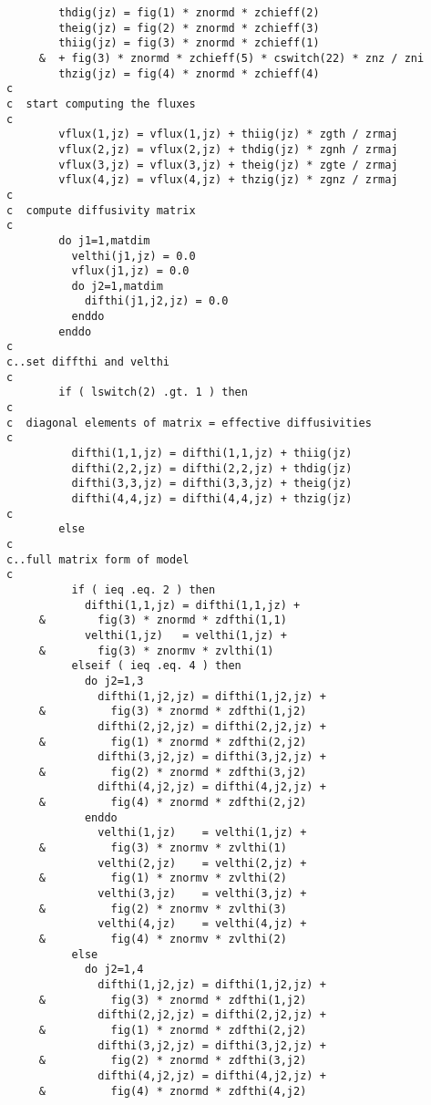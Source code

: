 \begin{verbatim}
        thdig(jz) = fig(1) * znormd * zchieff(2)
        theig(jz) = fig(2) * znormd * zchieff(3)
        thiig(jz) = fig(3) * znormd * zchieff(1)
     &  + fig(3) * znormd * zchieff(5) * cswitch(22) * znz / zni
        thzig(jz) = fig(4) * znormd * zchieff(4)
c
c  start computing the fluxes
c
        vflux(1,jz) = vflux(1,jz) + thiig(jz) * zgth / zrmaj
        vflux(2,jz) = vflux(2,jz) + thdig(jz) * zgnh / zrmaj
        vflux(3,jz) = vflux(3,jz) + theig(jz) * zgte / zrmaj
        vflux(4,jz) = vflux(4,jz) + thzig(jz) * zgnz / zrmaj
c
c  compute diffusivity matrix
c
        do j1=1,matdim
          velthi(j1,jz) = 0.0
          vflux(j1,jz) = 0.0
          do j2=1,matdim
            difthi(j1,j2,jz) = 0.0
          enddo
        enddo
c
c..set diffthi and velthi
c
        if ( lswitch(2) .gt. 1 ) then
c
c  diagonal elements of matrix = effective diffusivities
c
          difthi(1,1,jz) = difthi(1,1,jz) + thiig(jz)
          difthi(2,2,jz) = difthi(2,2,jz) + thdig(jz)
          difthi(3,3,jz) = difthi(3,3,jz) + theig(jz)
          difthi(4,4,jz) = difthi(4,4,jz) + thzig(jz)
c
        else
c
c..full matrix form of model
c
          if ( ieq .eq. 2 ) then
            difthi(1,1,jz) = difthi(1,1,jz) +
     &        fig(3) * znormd * zdfthi(1,1)
            velthi(1,jz)   = velthi(1,jz) +
     &        fig(3) * znormv * zvlthi(1)
          elseif ( ieq .eq. 4 ) then
            do j2=1,3
              difthi(1,j2,jz) = difthi(1,j2,jz) +
     &          fig(3) * znormd * zdfthi(1,j2)
              difthi(2,j2,jz) = difthi(2,j2,jz) +
     &          fig(1) * znormd * zdfthi(2,j2)
              difthi(3,j2,jz) = difthi(3,j2,jz) + 
     &          fig(2) * znormd * zdfthi(3,j2)
              difthi(4,j2,jz) = difthi(4,j2,jz) + 
     &          fig(4) * znormd * zdfthi(2,j2)
            enddo
              velthi(1,jz)    = velthi(1,jz) +
     &          fig(3) * znormv * zvlthi(1)
              velthi(2,jz)    = velthi(2,jz) +
     &          fig(1) * znormv * zvlthi(2)
              velthi(3,jz)    = velthi(3,jz) +
     &          fig(2) * znormv * zvlthi(3)
              velthi(4,jz)    = velthi(4,jz) +
     &          fig(4) * znormv * zvlthi(2)
          else
            do j2=1,4
              difthi(1,j2,jz) = difthi(1,j2,jz) +
     &          fig(3) * znormd * zdfthi(1,j2)
              difthi(2,j2,jz) = difthi(2,j2,jz) +
     &          fig(1) * znormd * zdfthi(2,j2)
              difthi(3,j2,jz) = difthi(3,j2,jz) +
     &          fig(2) * znormd * zdfthi(3,j2)
              difthi(4,j2,jz) = difthi(4,j2,jz) +
     &          fig(4) * znormd * zdfthi(4,j2)

\end{verbatim}
